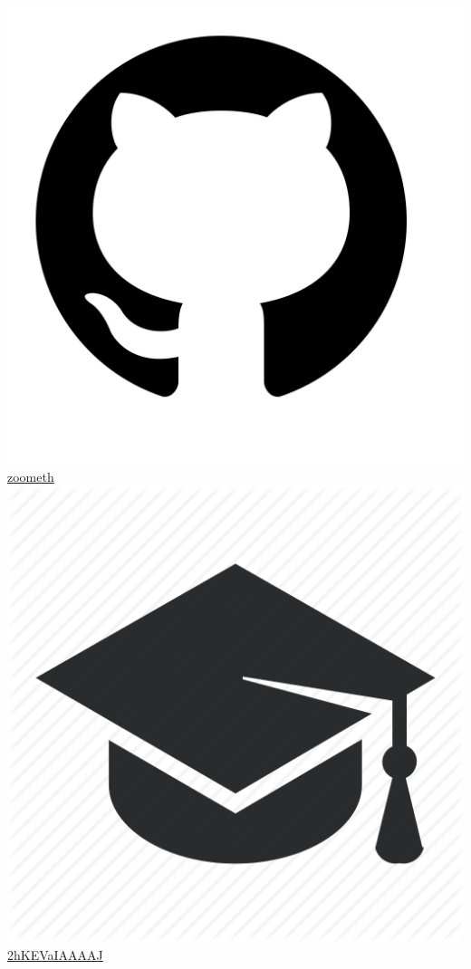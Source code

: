 \documentclass{article}
\begin{document}
\includegraphics[scale=0.007]{github} \quad \href{https://github.com/zoometh/thomashuet.github.io/blob/main/README.md}{zoometh} \\
\includegraphics[scale=0.025]{gscholar} \quad \href{https://scholar.google.fr/citations?user=2hKEVaIAAAAJ}{2hKEVaIAAAAJ} \\
\end{document}
